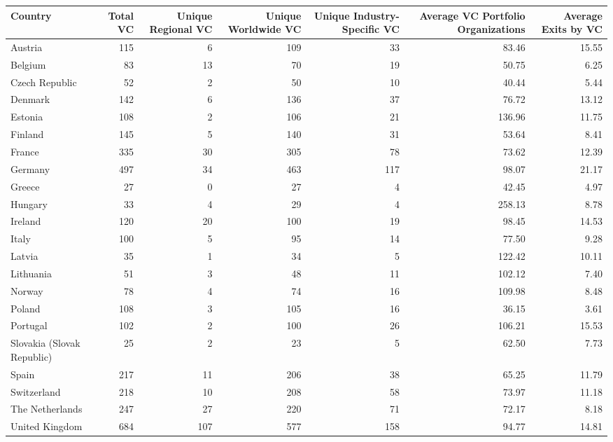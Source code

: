 \begin{tabular}{lrrrrrr}
  \toprule
Country & Total VC & Unique Regional VC & Unique Worldwide VC & Unique Industry-Specific VC & Average VC Portfolio Organizations & Average Exits by VC \\ 
  \midrule
Austria & 115 & 6 & 109 & 33 & 83.46 & 15.55 \\ 
  Belgium & 83 & 13 & 70 & 19 & 50.75 & 6.25 \\ 
  Czech Republic & 52 & 2 & 50 & 10 & 40.44 & 5.44 \\ 
  Denmark & 142 & 6 & 136 & 37 & 76.72 & 13.12 \\ 
  Estonia & 108 & 2 & 106 & 21 & 136.96 & 11.75 \\ 
  Finland & 145 & 5 & 140 & 31 & 53.64 & 8.41 \\ 
  France & 335 & 30 & 305 & 78 & 73.62 & 12.39 \\ 
  Germany & 497 & 34 & 463 & 117 & 98.07 & 21.17 \\ 
  Greece & 27 & 0 & 27 & 4 & 42.45 & 4.97 \\ 
  Hungary & 33 & 4 & 29 & 4 & 258.13 & 8.78 \\ 
  Ireland & 120 & 20 & 100 & 19 & 98.45 & 14.53 \\ 
  Italy & 100 & 5 & 95 & 14 & 77.50 & 9.28 \\ 
  Latvia & 35 & 1 & 34 & 5 & 122.42 & 10.11 \\ 
  Lithuania & 51 & 3 & 48 & 11 & 102.12 & 7.40 \\ 
  Norway & 78 & 4 & 74 & 16 & 109.98 & 8.48 \\ 
  Poland & 108 & 3 & 105 & 16 & 36.15 & 3.61 \\ 
  Portugal & 102 & 2 & 100 & 26 & 106.21 & 15.53 \\ 
  Slovakia (Slovak Republic) & 25 & 2 & 23 & 5 & 62.50 & 7.73 \\ 
  Spain & 217 & 11 & 206 & 38 & 65.25 & 11.79 \\ 
  Switzerland & 218 & 10 & 208 & 58 & 73.97 & 11.18 \\ 
  The Netherlands & 247 & 27 & 220 & 71 & 72.17 & 8.18 \\ 
  United Kingdom & 684 & 107 & 577 & 158 & 94.77 & 14.81 \\ 
   \bottomrule
\end{tabular}
